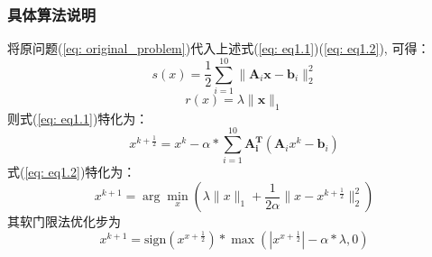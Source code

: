 \documentclass{article}
\begin{document}
\subsubsection{具体算法说明}
将原问题(\ref{eq: original_problem})代入上述式(\ref{eq: eq1.1})(\ref{eq: eq1.2}),
可得：
\begin{equation}
    s(x) = \frac {1}{2} \sum_{i=1}^{10} \|\mathbf{A}_i \mathbf{x} - \mathbf{b}_i\|_2^2
\end{equation}
\begin{equation}
    r(x) =  \lambda \|\mathbf{x}\|_1
\end{equation}
则式(\ref{eq: eq1.1})特化为：
\begin{equation}
    x^{k+\frac{1}{2}} = x^k - \alpha * \sum_{i=1}^{10} \mathbf{A_i^T} (\mathbf{A}_i x^k - \mathbf{b}_i)
    \label{eq: eq1.3}
\end{equation}
式(\ref{eq: eq1.2})特化为：
\begin{equation}
    x^{k+1} = \arg\min_x (\lambda\|x\|_1 + \frac{1}{2 \alpha} \|x - x^{k+\frac{1}{2}}\|_2^2)
    \label{eq: eq1.4}
\end{equation}
其软门限法优化步为
\begin{equation}
    x^{k+1} = \text{sign}(x^{x+\frac{1}{2}}) * \max (|x^{x+\frac{1}{2}}| - \alpha*\lambda,0)
    \label{eq: eq1.5}
\end{equation}
\end{document}
